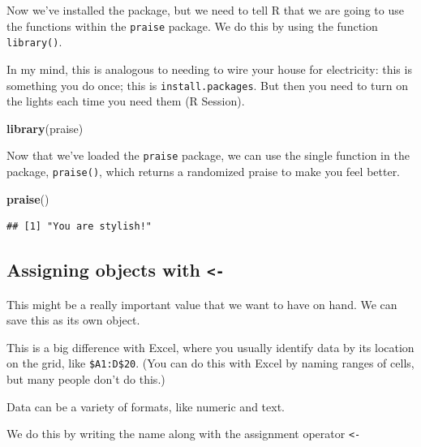 \documentclass[]{book}
\newenvironment{Shaded}{\begin{snugshade}}{\end{snugshade}}
\newcommand{\KeywordTok}[1]{\textcolor[rgb]{0.13,0.29,0.53}{\textbf{#1}}}
\newcommand{\NormalTok}[1]{#1}
\newcommand{\OperatorTok}[1]{\textcolor[rgb]{0.81,0.36,0.00}{\textbf{#1}}}
\newcommand{\StringTok}[1]{\textcolor[rgb]{0.31,0.60,0.02}{#1}}
\begin{document}
Now we've installed the package, but we need to tell R that we are going to use the functions within the \texttt{praise} package. We do this by using the function \texttt{library()}.

In my mind, this is analogous to needing to wire your house for electricity: this is something you do once; this is \texttt{install.packages}. But then you need to turn on the lights each time you need them (R Session).

\begin{Shaded}
\begin{Highlighting}[]
\KeywordTok{library}\NormalTok{(praise)}
\end{Highlighting}
\end{Shaded}

Now that we've loaded the \texttt{praise} package, we can use the single function in the package, \texttt{praise()}, which returns a randomized praise to make you feel better.

\begin{Shaded}
\begin{Highlighting}[]
\KeywordTok{praise}\NormalTok{()}
\end{Highlighting}
\end{Shaded}

\begin{verbatim}
## [1] "You are stylish!"
\end{verbatim}

\hypertarget{assigning-objects-with--}{%
\subsection{\texorpdfstring{Assigning objects with \texttt{\textless{}-}}{Assigning objects with \textless{}-}}\label{assigning-objects-with--}}

This might be a really important value that we want to have on hand. We can save this as its own object.

This is a big difference with Excel, where you usually identify data by its location on the grid, like \texttt{\$A1:D\$20}. (You can do this with Excel by naming ranges of cells, but many people don't do this.)

Data can be a variety of formats, like numeric and text.

We do this by writing the name along with the assignment operator \texttt{\textless{}-}

\begin{Shaded}
\end{Shaded}
\end{document}
